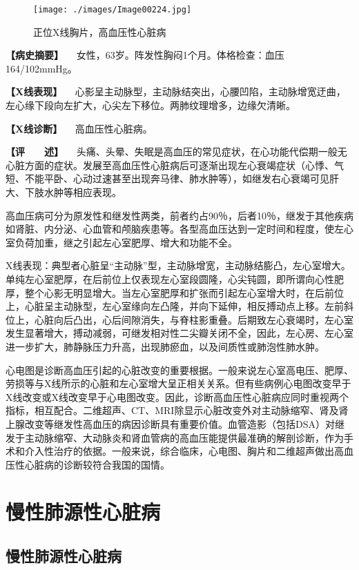 \begin{figure}[!htbp]
 \centering
 \texttt{[image: ./images/Image00224.jpg]}
 \captionsetup{justification=centering}
 \caption{正位X线胸片，高血压性心脏病}
 \label{fig4-4-1}
  \end{figure} 

\textbf{【病史摘要】}
　女性，63岁。阵发性胸闷1个月。体格检查：血压164/102mmHg。

\textbf{【X线表现】}
　心影呈主动脉型，主动脉结突出，心腰凹陷，主动脉增宽迂曲，左心缘下段向左扩大，心尖左下移位。两肺纹理增多，边缘欠清晰。

\textbf{【X线诊断】} 　高血压性心脏病。

\textbf{【评　　述】}
　头痛、头晕、失眠是高血压的常见症状，在心功能代偿期一般无心脏方面的症状。发展至高血压性心脏病后可逐渐出现左心衰竭症状（心悸、气短、不能平卧、心动过速甚至出现奔马律、肺水肿等），如继发右心衰竭可见肝大、下肢水肿等相应表现。

高血压病可分为原发性和继发性两类，前者约占90％，后者10％，继发于其他疾病如肾脏、内分泌、心血管和颅脑疾患等。各型高血压达到一定时间和程度，使左心室负荷加重，继之引起左心室肥厚、增大和功能不全。

X线表现：典型者心脏呈“主动脉”型，主动脉增宽，主动脉结膨凸，左心室增大。单纯左心室肥厚，在后前位上仅表现左心室段圆隆，心尖钝圆，即所谓向心性肥厚，整个心影无明显增大。当左心室肥厚和扩张而引起左心室增大时，在后前位上，心脏呈主动脉型，左心室缘向左凸隆，并向下延伸，相反搏动点上移。左前斜位上，心脏向后凸出，心后间隙消失，与脊柱影重叠。后期致左心衰竭时，左心室发生显著增大，搏动减弱，可继发相对性二尖瓣关闭不全，因此，左心房、左心室进一步扩大，肺静脉压力升高，出现肺瘀血，以及间质性或肺泡性肺水肿。

心电图是诊断高血压引起的心脏改变的重要根据。一般来说左心室高电压、肥厚、劳损等与X线所示的心脏和左心室增大呈正相关关系。但有些病例心电图改变早于X线改变或X线改变早于心电图改变。因此，诊断高血压性心脏病应同时重视两个指标，相互配合。二维超声、CT、MRI除显示心脏改变外对主动脉缩窄、肾及肾上腺改变等继发性高血压的病因诊断具有重要价值。血管造影（包括DSA）对继发于主动脉缩窄、大动脉炎和肾血管病的高血压能提供最准确的解剖诊断，作为手术和介入性治疗的依据。一般来说，综合临床，心电图、胸片和二维超声做出高血压性心脏病的诊断较符合我国的国情。

\section{慢性肺源性心脏病}

\subsection{慢性肺源性心脏病}

